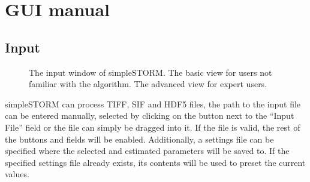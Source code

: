 \documentclass[a4paper,12pt,notitlepage]{report}
\begin{document}
\chapter{GUI manual}
\section{Input}
\begin{figure}[ht]
    \hfill
    \caption[]{The input window of simpleSTORM.  The basic view for users not familiar with the algorithm.  The advanced view for expert users.}
    \label{fig:input}
\end{figure}

simpleSTORM can process TIFF, SIF and HDF5 files, the path to the input file can be entered manually, selected by clicking on the button next to the ``Input File'' field or the file can simply be dragged into it. If the file is valid, the rest of the buttons and fields will be enabled. Additionally, a settings file can be specified where the selected and estimated parameters will be saved to. If the specified settings file already exists, its contents will be used to preset the current values.
\end{document}
